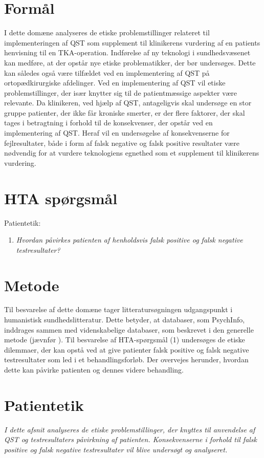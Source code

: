 \section{Formål}
I dette domæne analyseres de etiske problemstillinger relateret til implementeringen af QST som supplement til klinikerens vurdering af en patients henvisning til en TKA-operation. Indførelse af ny teknologi i sundhedsvæsenet kan medføre, at der opstår nye etiske problematikker, der bør undersøges. Dette kan således også være tilfældet ved en implementering af QST på ortopædkirurgiske afdelinger. Ved en implementering af QST vil etiske problemstillinger, der især knytter sig til de patientmæssige aspekter være relevante. Da klinikeren, ved hjælp af QST, antageligvis skal undersøge en stor gruppe patienter, der ikke får kroniske smerter, er der flere faktorer, der skal tages i betragtning i forhold til de konsekvenser, der opstår ved en implementering af QST. Heraf vil en undersøgelse af konsekvenserne for fejlresultater, både i form af falsk negative og falsk positive resultater være nødvendig for at vurdere teknologiens egnethed som et supplement til klinikerens vurdering.



\section{HTA spørgsmål}
Patientetik:
\begin{enumerate}
\item \textit{Hvordan påvirkes patienten af henholdsvis falsk positive og falsk negative testresultater?} %
\end{enumerate}


\section{Metode}
Til besvarelse af dette domæne tager litteratursøgningen udgangspunkt i humanistisk sundhedslitteratur. Dette betyder, at databaser, som PsychInfo, inddrages sammen med videnskabelige databaser, som beskrevet i den generelle metode (jævnfør ). 
Til besvarelse af HTA-spørgsmål (1) undersøges de etiske dilemmaer, der kan opstå ved at give patienter falsk positive og falsk negative testresultater som led i et behandlingsforløb. Der overvejes herunder, hvordan dette kan påvirke patienten og dennes videre behandling.


\section{Patientetik}
\textit{I dette afsnit analyseres de etiske problemstillinger, der knyttes til anvendelse af QST og testresultaters påvirkning af patienten. Konsekvenserne i forhold til falsk positive og falsk negative testresultater vil blive undersøgt og analyseret.}


